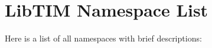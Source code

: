 \section{Lib\-TIM Namespace List}
Here is a list of all namespaces with brief descriptions:\begin{CompactList}
\item{}
\item{}
\end{CompactList}
